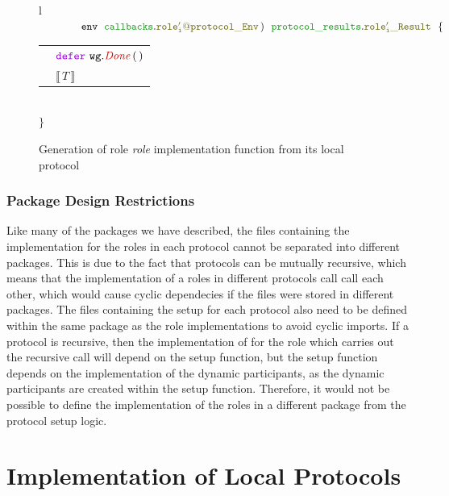 \documentclass[12pt,twoside]{report}
\begin{document}
\begin{figure}[!h]
\begin{center}
\begin{tabular}{l}
            $\qquad \qquad \envparam\;\ \envtype{role'_i}{protocol}\,)\ \ \resulttype{role'_i}{protocol}\ \ \{$\\[6pt]
            
            \begin{tabular}{ll}
                \indent & $\godefer\ \methodcall{wg}{Done}\,(\,)$\\[3.5pt]
                \indent & $\llbracket \, T \, \rrbracket$
            \end{tabular}\\[6pt]

            $\}$\\

        \end{tabular}
    \end{center}
    \caption{Generation of role \textit{role} implementation function from its local protocol}
    \label{role-func-sig-gen}
\end{figure}

\subsection{Package Design Restrictions}

Like many of the packages we have described, the files containing the implementation for the roles in each protocol cannot be separated into different packages. This is due to the fact that protocols can be mutually recursive, which means that the implementation of a roles in different protocols call call each other, which would cause cyclic dependecies if the files were stored in different packages. The files containing the setup for each protocol also need to be defined within the same package as the role implementations to avoid cyclic imports. If a protocol is recursive, then the implementation of for the role which carries out the recursive call will depend on the setup function, but the setup function depends on the implementation of the dynamic participants, as the dynamic participants are created within the setup function. Therefore, it would not be possible to define the implementation of the roles in a different package from the protocol setup logic.\\


\chapter{Implementation of Local Protocols}\label{local-protocol-codegen}
\end{document}
